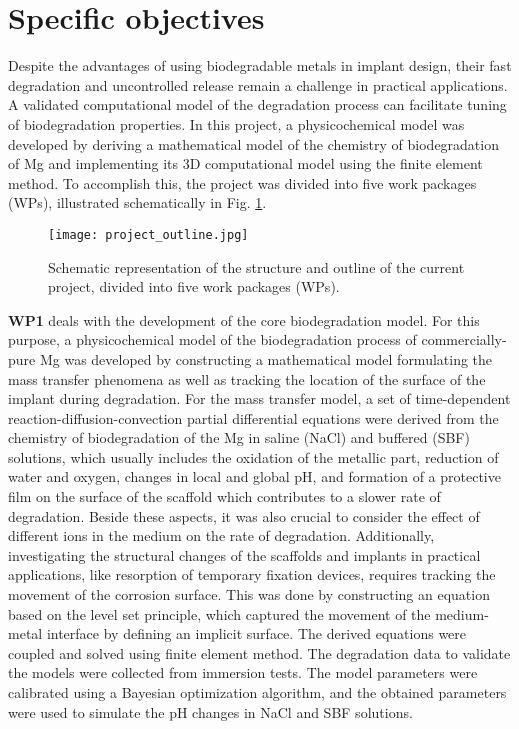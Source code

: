 \section{Specific objectives} \label{sec:aim_objective}

Despite the advantages of using biodegradable metals in implant design, their fast degradation and uncontrolled release remain a challenge in practical applications. A validated computational model of the degradation process can facilitate tuning of biodegradation properties. In this project, a physicochemical model was developed by deriving a mathematical model of the chemistry of biodegradation of Mg and implementing its 3D computational model using the finite element method. To accomplish this, the project was divided into five work packages (WPs), illustrated schematically in Fig. \ref{fig:objective_project_outline}.

\begin{figure}
\centering
\medskip
\texttt{[image: project\_outline.jpg]}
\caption[Schematic of the project outline]{Schematic representation of the structure and outline of the current project, divided into five work packages (WPs).} \label{fig:objective_project_outline}
\end{figure}

\textbf{WP1} deals with the development of the core biodegradation model. For this purpose, a physicochemical model of the biodegradation process of commercially-pure Mg was developed by constructing a mathematical model formulating the mass transfer phenomena as well as tracking the location of the surface of the implant during degradation. For the mass transfer model, a set of time-dependent reaction-diffusion-convection partial differential equations were derived from the chemistry of biodegradation of the Mg in saline (NaCl) and buffered (SBF) solutions, which usually includes the oxidation of the metallic part, reduction of water and oxygen, changes in local and global pH, and formation of a protective film on the surface of the scaffold which contributes to a slower rate of degradation. Beside these aspects, it was also crucial to consider the effect of different ions in the medium on the rate of degradation. Additionally, investigating the structural changes of the scaffolds and implants in practical applications, like resorption of temporary fixation devices, requires tracking the movement of the corrosion surface. This was done by constructing an equation based on the level set principle, which captured the movement of the medium-metal interface by defining an implicit surface. The derived equations were coupled and solved using finite element method. The degradation data to validate the models were collected from immersion tests. The model parameters were calibrated using a Bayesian optimization algorithm, and the obtained parameters were used to simulate the pH changes in NaCl and SBF solutions.

